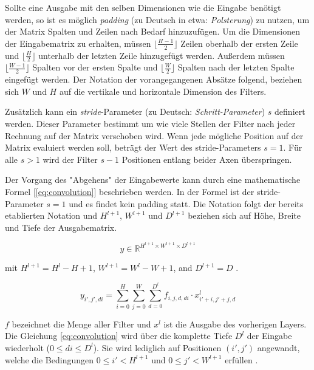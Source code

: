 Sollte eine Ausgabe mit den selben Dimensionen wie die Eingabe ben\"otigt werden, so ist es m\"oglich \textit{padding} (zu Deutsch in etwa: \textit{Polsterung}) zu nutzen, um der Matrix Spalten und Zeilen nach Bedarf hinzuzuf\"ugen. Um die Dimensionen der Eingabematrix zu erhalten, m\"ussen $\lfloor \frac{H-1}{2} \rfloor$ Zeilen oberhalb der ersten Zeile und $\lfloor \frac{H}{2} \rfloor$ unterhalb der letzten Zeile hinzugef\"ugt werden. Außerdem m\"ussen $\lfloor \frac{W-1}{2} \rfloor$ Spalten vor der ersten Spalte und $\lfloor \frac{W}{2} \rfloor$ Spalten nach der letzten Spalte eingef\"ugt werden. Der Notation der vorangegangenen Abs\"atze folgend, beziehen sich $W$ und $H$ auf die vertikale und horizontale Dimension des Filters.

Zus\"atzlich kann ein \textit{stride}-Parameter (zu Deutsch: \textit{Schritt-Parameter}) $s$ definiert werden. Dieser Parameter bestimmt um wie viele Stellen der Filter nach jeder Rechnung auf der Matrix verschoben wird. Wenn jede m\"ogliche Position auf der Matrix evaluiert werden soll, betr\"agt der Wert des stride-Parameters $s=1$. F\"ur alle $s > 1$ wird der Filter $s - 1$ Positionen entlang beider Axen \"uberspringen.

Der Vorgang des "Abgehens" der Eingabewerte kann durch eine mathematische Formel [\ref{eq:convolution}] beschrieben werden. In der Formel ist der stride-Parameter $s=1$ und es findet kein padding statt. Die Notation folgt der bereits etablierten Notation und $H^{l+1}$, $W^{l+1}$ und $D^{l+1}$ beziehen sich auf H\"ohe, Breite und Tiefe der Ausgabematrix.
 
\begin{equation}
y \in \mathbb{R}^{H^{l+1} \times W^{l+1} \times D^{l+1}}
\end{equation}

mit $H^{l+1} = H^l - H + 1$, $W^{l+1} = W^l - W + 1$, and $D^{l+1} = D$ \parencite{Wu.2017}.


\begin{equation}
\label{eq:convolution}
y_{i',j',di} = \sum_{i=0}^{H}\sum_{j=0}^{W}\sum_{d =0}^{D^l} f_{i,j,d,di} \cdot x^{l}_{i'+i, j'+j, d}
\end{equation}

$f$ bezeichnet die Menge aller Filter und $x^l$ ist die Ausgabe des vorherigen Layers. Die Gleichung \ref{eq:convolution} wird \"uber die komplette Tiefe $D^l$ der Eingabe wiederholt ($0 \leq di \leq D^l$). Sie wird lediglich auf Positionen $(i',j')$ angewandt, welche die Bedingungen $0 \leq i' < H^{l + 1}$ und $0 \leq j' < W^{l + 1}$ erfüllen \parencite{Wu.2017}.

